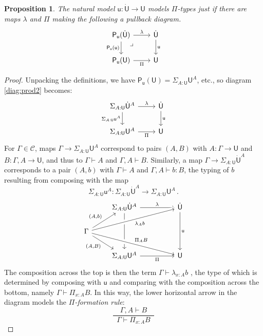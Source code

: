 \documentclass[12pt,reqno]{amsart}
\newcommand{\CC}{\ensuremath{\mathcal{C}}}
\newcommand{\alg}[1]{\ensuremath{\mathsf{#1}}}
\renewcommand{\to}{\ensuremath{\rightarrow}}
\newcommand{\G}{\ensuremath{\Gamma}}
\newcommand{\ext}[2]{{#1,#2}}
\renewcommand{\t}{\ensuremath{\mathsf{u}}}
\newcommand{\T}{\ensuremath{\mathsf{U}}}
\newcommand{\TT}{\ensuremath{\dot{\mathsf{U}}}}
\newcommand{\tT}{\ensuremath{{\t}:\TT\to\T}}
\newcommand{\pbcorner}{\arrow[dr,phantom,"\lrcorner" very near start, shift right=.5ex]} %
\newtheorem{proposition}[theorem]{Proposition}
\theoremstyle{remark}
\theoremstyle{definition}
\begin{document}
\begin{proposition}  The natural model $\tT$ models $\Pi$-types just if there are maps $\lambda$ and $\Pi$ making the following a pullback diagram. 
\begin{equation}\label{diag:prod2}
\begin{tikzcd}
\alg{P}_\t(\TT)  \ar[d,swap, "{\alg{P}_\t(\t)}"]   \ar[r, "\lambda"]  \pbcorner &  \TT \ar[d, "{\t}"]\\
\alg{P}_\t(\T)	\ar[r,swap, "{\Pi}"] & \T
\end{tikzcd}
\end{equation}
\end{proposition}
%
\begin{proof}
Unpacking the definitions, we have $\alg{P}_\t(\T) = \Sigma_{A:\T} \T^A $, etc.,  
so diagram \eqref{diag:prod2} becomes:
\begin{equation*}
\begin{tikzcd}
\Sigma_{A:\T} \TT^A \ar[d,swap, "{\Sigma_{A:\T} \t^A}"]  \ar[r, "{\lambda}"] &  \TT \ar[d,"{\t}"] \\
\Sigma_{A:\T} \T^A    \ar[r, swap,"{\Pi}"] & \T
\end{tikzcd}
\end{equation*}
For $\G \in \CC$, maps $\G\to \Sigma_{A:\T} \T^A $ correspond to pairs $(A,B)$ with  $A:\G\to \T$ and $B : \ext{\G}{A} \to \T$, and thus to $\G\vdash A$ and $\ext{\G}{A} \vdash B$. Similarly, a map $\G\to \Sigma_{A:\T} \TT^A $ corresponds to a pair $(A,b)$ with $\G\vdash A$ and $\ext{\G}{A} \vdash b : B$, the typing of $b$ resulting from composing with the map 
\[
\Sigma_{A:\T} \t^A : \Sigma_{A:\T} \TT^A \to \Sigma_{A:\T} \T^A\,.
\]
\begin{equation*}
\begin{tikzcd}
	& \Sigma_{A:\T} \TT^A \ar[dd]  \ar[rr, "{\lambda}"] &&  \TT \ar[dd,"{\t}"] \\
\G \ar[dr,swap, "{(A,B)}"] \ar[ru, "{(A,b)}"] \ar[urrr, swap, crossing over, "{ \lambda_{A}b }"] \ar[drrr, crossing over, "{ \Pi_{A}B }"] &&& \\
 	& \Sigma_{A:\T}\T^A    \ar[rr, swap,"{\Pi}"] && \T 
\end{tikzcd}
\end{equation*}
The composition across the top is then the term $\G \vdash \lambda_{x:A} b$ , the type of which is determined by composing with $\t$ and comparing with the composition across the bottom, namely $\G \vdash \Pi_{x:A} B$. In this way, the lower horizontal arrow in the diagram models the \emph{$\Pi$-formation rule}:
\[
\frac{\quad\ext{\G}{A}\vdash B\quad}{\G\vdash \Pi_{x:A} B}
\]
\end{proof}
\end{document}
